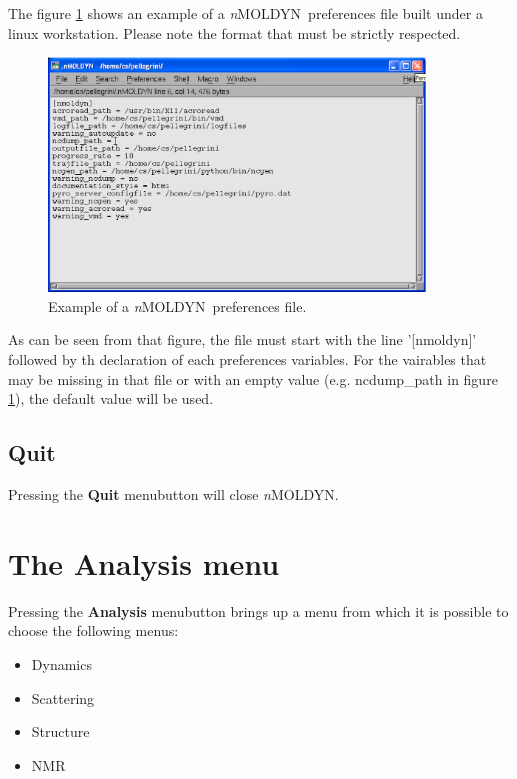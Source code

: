 \documentclass[a4paper,11pt]{report}
\newcommand{\NMOLDYN}{\textit{n}MOLDYN}
\begin{document}
The figure \ref{fig:preferences_config_file_example} shows an example of a \NMOLDYN\ preferences file built under a linux 
workstation. Please note the format that must be strictly respected.
\newpage
\begin{figure}[h!]
\begin{center}
\includegraphics[width=10cm]{Figures/preferences_config_file_example.eps}
\end{center}
\caption[Example of a preferences file]{Example of a \NMOLDYN\ preferences file.}
\label{fig:preferences_config_file_example}
\end{figure}   

As can be seen from that figure, the file must start with the line '[nmoldyn]' followed by th declaration of each preferences 
variables. For the vairables that may be missing in that file or with an empty value (e.g. ncdump\_path in figure 
\ref{fig:preferences_config_file_example}), the default value will be used.

\subsection{Quit}
\label{quit}
Pressing the \textbf{Quit} menubutton will close \NMOLDYN .

\section{The \textbf{Analysis} menu}
\label{analysis_menu}
Pressing the \textbf{Analysis} menubutton brings up a menu from which it is possible to choose the following menus:
\begin{itemize}
\item Dynamics
\item Scattering
\item Structure
\item NMR
\end{itemize}
\end{document}
